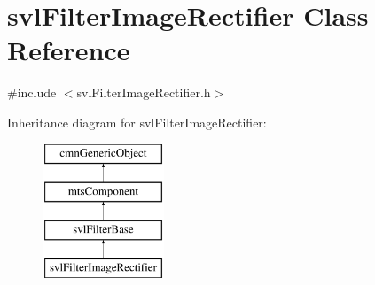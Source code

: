 \hypertarget{classsvl_filter_image_rectifier}{}\section{svl\+Filter\+Image\+Rectifier Class Reference}
\label{classsvl_filter_image_rectifier}


{\ttfamily \#include $<$svl\+Filter\+Image\+Rectifier.\+h$>$}

Inheritance diagram for svl\+Filter\+Image\+Rectifier\+:\begin{figure}[H]
\begin{center}
\leavevmode
\includegraphics[height=4.000000cm]{d2/db6/classsvl_filter_image_rectifier}
\end{center}
\end{figure}
